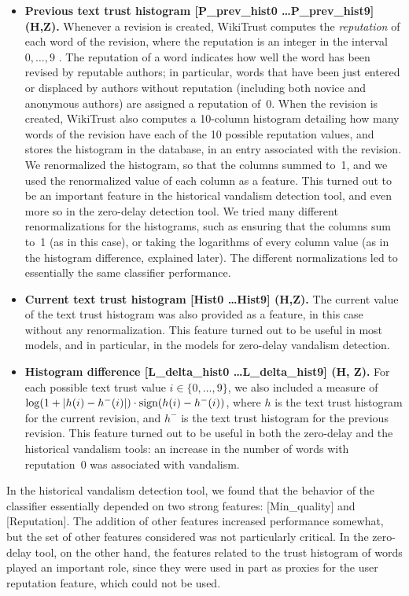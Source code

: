 \begin{itemize}
\item {\bf Previous text trust histogram [P\_prev\_hist0 \ldots P\_prev\_hist9] (H,Z).}  
Whenever a revision is created, WikiTrust computes the {\em reputation\/} of each word of the revision, where the reputation is an integer in the interval $0, \ldots, 9$ \cite{WikiTrust08}.
The reputation of a word indicates how well the word has been revised by reputable authors; in particular, words that have been just entered or displaced by authors without reputation (including both novice and anonymous authors) are assigned a reputation of~0.
When the revision is created, WikiTrust also computes a 10-column histogram detailing how many words of the revision have each of the 10 possible reputation values, and stores the histogram in the database, in an entry associated with the revision.
We renormalized the histogram, so that the columns summed to~1, and we used the renormalized value of each column as a feature. 
This turned out to be an important feature in the historical vandalism detection tool, and even more so in the zero-delay detection tool. 
We tried many different renormalizations for the histograms, such as ensuring that the columns sum to~1 (as in this case), or taking the logarithms of every column value (as in the histogram difference, explained later).
The different normalizations led to essentially the same classifier performance.

\item {\bf Current text trust histogram [Hist0 \ldots Hist9] (H,Z).}  The current value of the text trust histogram was also provided as a feature, in this case without any renormalization. 
This feature turned out to be useful in most models, and in particular, in the models for zero-delay vandalism detection.

\item {\bf Histogram difference [L\_delta\_hist0 \ldots L\_delta\_hist9] (H, Z).}  For each possible text trust value $i \in \{0, \ldots, 9\}$, we also included a measure of $\log(1 + |h(i) - h^{-}(i)|) \cdot {{\textrm{sign}}}(h(i) - h^{-}(i))$, where $h$ is the text trust histogram for the current revision, and $h^{-}$ is the text trust histogram for the previous revision. 
This feature turned out to be useful in both the zero-delay and the historical vandalism tools: an increase in the number of words with reputation~0 was associated with vandalism. 

\end{itemize}
%
In the historical vandalism detection tool, we found that the behavior of the classifier essentially depended on two strong features: [Min\_quality] and [Reputation].  The addition of other features increased performance somewhat, but the set of other features considered was not particularly critical. 
In the zero-delay tool, on the other hand, the features related to the trust histogram of words played an important role, since they were used in part as proxies for the user reputation feature, which could not be used.

